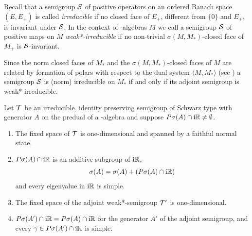 Recall that a semigroup $\mathcal{S}$ of positive operators on an ordered Banach space $(E,E_{+})$ is called \emph{irreducible} if no closed face of\/ $E_{+}$, different from $\{0\}$ and $E_{+}$, is invariant under $\mathcal{S}$.
In the context of \WA-algebras $M$ we call a semigroup $\mathcal{S}$ of positive maps on $M$ \emph{weak*-irreducible} if no non-trivial $\sigma(M,M_{*})$-closed face of\/ $M_{+}$ is $\mathcal{S}$-invariant.

Since the norm closed faces of\/ $M_{*}$ and the $\sigma(M,M_{*})$-closed faces of\/ $M$ are related by formation of polars with respect to the dual system $\langle M,M_{*} \rangle$ (see \textcite[Theorem 3.6.11 and Theorem 3.10.7.]{pedersen:1979}) a semigroup $\mathcal{S}$ is (norm) irreducible on $M_{*}$ if and only if its adjoint semigroup is weak*-irreducible.
\begin{theorem}\label{thm:d3-1.11}
Let $\mathcal{T}$ be an irreducible, identity preserving semigroup of Schwarz type with generator $A$ on the predual of a \WA-algebra and suppose $P\sigma(A) \cap \mathrm{i}\mathbb{R} \neq \emptyset$.
\begin{enumerate}[\upshape (i)]
\item 
The fixed space of\/ $\mathcal{T}$ is one-dimensional and spanned by a faithful normal state.

\item 
$P\sigma(A) \cap \mathrm{i}\mathbb{R}$ is an additive subgroup of\/ $\mathrm{i}\mathbb{R}$,
\[
\sigma(A) = \sigma(A) + (P\sigma(A) \cap \mathrm{i}\mathbb{R})
\]
and every eigenvalue in $\mathrm{i}\mathbb{R}$ is simple.

\item 
The fixed space of the adjoint weak*-semigroup $\mathcal{T}'$ is one-dimensional.

\item 
$P{\sigma}(A') \cap \mathrm{i}\mathbb{R} = P\sigma(A) \cap \mathrm{i}\mathbb{R}$ for the generator $A'$ of the adjoint semigroup, and every $\gamma \in P{\sigma}(A') \cap \mathrm{i}\mathbb{R}$ is simple.
\end{enumerate}
\end{theorem}
